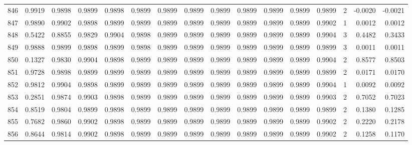 \begin{tabular}{lrrrrrrrrrrrrrrr}
846 &      0.9919 &  0.9898 &  0.9899 &  0.9898 &  0.9899 &  0.9899 &  0.9899 &  0.9899 &  0.9899 &  0.9899 &   0.9899 &     0.9899 &      2 &                   -0.0020 &                    -0.0021 \\
847 &      0.9890 &  0.9902 &  0.9898 &  0.9899 &  0.9899 &  0.9899 &  0.9899 &  0.9899 &  0.9899 &  0.9899 &   0.9899 &     0.9902 &      1 &                    0.0012 &                     0.0012 \\
848 &      0.5422 &  0.8855 &  0.9829 &  0.9904 &  0.9898 &  0.9899 &  0.9899 &  0.9899 &  0.9899 &  0.9899 &   0.9899 &     0.9904 &      3 &                    0.4482 &                     0.3433 \\
849 &      0.9888 &  0.9899 &  0.9898 &  0.9899 &  0.9898 &  0.9899 &  0.9899 &  0.9899 &  0.9899 &  0.9899 &   0.9899 &     0.9899 &      3 &                    0.0011 &                     0.0011 \\
850 &      0.1327 &  0.9830 &  0.9904 &  0.9898 &  0.9899 &  0.9899 &  0.9899 &  0.9899 &  0.9899 &  0.9899 &   0.9899 &     0.9904 &      2 &                    0.8577 &                     0.8503 \\
851 &      0.9728 &  0.9898 &  0.9899 &  0.9899 &  0.9899 &  0.9899 &  0.9899 &  0.9899 &  0.9899 &  0.9899 &   0.9899 &     0.9899 &      2 &                    0.0171 &                     0.0170 \\
852 &      0.9812 &  0.9904 &  0.9898 &  0.9899 &  0.9899 &  0.9899 &  0.9899 &  0.9899 &  0.9899 &  0.9899 &   0.9899 &     0.9904 &      1 &                    0.0092 &                     0.0092 \\
853 &      0.2851 &  0.9874 &  0.9903 &  0.9898 &  0.9899 &  0.9899 &  0.9899 &  0.9899 &  0.9899 &  0.9899 &   0.9899 &     0.9903 &      2 &                    0.7052 &                     0.7023 \\
854 &      0.8519 &  0.9804 &  0.9899 &  0.9898 &  0.9899 &  0.9899 &  0.9899 &  0.9899 &  0.9899 &  0.9899 &   0.9899 &     0.9899 &      2 &                    0.1380 &                     0.1285 \\
855 &      0.7682 &  0.9860 &  0.9902 &  0.9898 &  0.9899 &  0.9899 &  0.9899 &  0.9899 &  0.9899 &  0.9899 &   0.9899 &     0.9902 &      2 &                    0.2220 &                     0.2178 \\
856 &      0.8644 &  0.9814 &  0.9902 &  0.9898 &  0.9899 &  0.9899 &  0.9899 &  0.9899 &  0.9899 &  0.9899 &   0.9899 &     0.9902 &      2 &                    0.1258 &                     0.1170 \\

\end{tabular}
